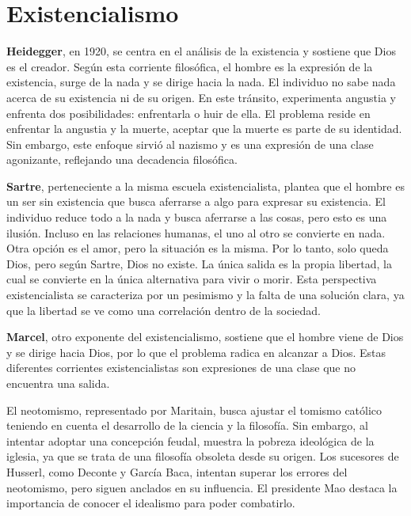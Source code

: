 \documentclass[
  a4paper,
]{article}
\begin{document}
\hypertarget{existencialismo}{%
\section{Existencialismo}\label{existencialismo}}

\textbf{Heidegger}, en 1920, se centra en el análisis de la existencia y
sostiene que Dios es el creador. Según esta corriente filosófica, el
hombre es la expresión de la existencia, surge de la nada y se dirige
hacia la nada. El individuo no sabe nada acerca de su existencia ni de
su origen. En este tránsito, experimenta angustia y enfrenta dos
posibilidades: enfrentarla o huir de ella. El problema reside en
enfrentar la angustia y la muerte, aceptar que la muerte es parte de su
identidad. Sin embargo, este enfoque sirvió al nazismo y es una
expresión de una clase agonizante, reflejando una decadencia filosófica.

\textbf{Sartre}, perteneciente a la misma escuela existencialista,
plantea que el hombre es un ser sin existencia que busca aferrarse a
algo para expresar su existencia. El individuo reduce todo a la nada y
busca aferrarse a las cosas, pero esto es una ilusión. Incluso en las
relaciones humanas, el uno al otro se convierte en nada. Otra opción es
el amor, pero la situación es la misma. Por lo tanto, solo queda Dios,
pero según Sartre, Dios no existe. La única salida es la propia
libertad, la cual se convierte en la única alternativa para vivir o
morir. Esta perspectiva existencialista se caracteriza por un pesimismo
y la falta de una solución clara, ya que la libertad se ve como una
correlación dentro de la sociedad.

\textbf{Marcel}, otro exponente del existencialismo, sostiene que el
hombre viene de Dios y se dirige hacia Dios, por lo que el problema
radica en alcanzar a Dios. Estas diferentes corrientes existencialistas
son expresiones de una clase que no encuentra una salida.

El neotomismo, representado por Maritain, busca ajustar el tomismo
católico teniendo en cuenta el desarrollo de la ciencia y la filosofía.
Sin embargo, al intentar adoptar una concepción feudal, muestra la
pobreza ideológica de la iglesia, ya que se trata de una filosofía
obsoleta desde su origen. Los sucesores de Husserl, como Deconte y
García Baca, intentan superar los errores del neotomismo, pero siguen
anclados en su influencia. El presidente Mao destaca la importancia de
conocer el idealismo para poder combatirlo.
\end{document}
